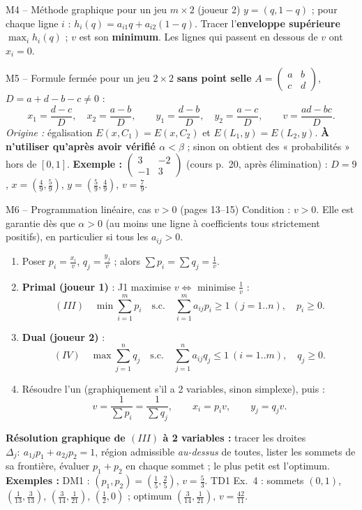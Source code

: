 \documentclass[11pt,a4paper]{article}
\begin{document}
\begin{methbox}{M4 -- Méthode graphique pour un jeu $m\times 2$ (joueur 2)}
$y=(q,1-q)$ ; pour chaque ligne $i$ : $h_i(q)=a_{i1}q+a_{i2}(1-q)$. Tracer l'\textbf{enveloppe supérieure} $\max_i h_i(q)$ ; $v$ est son \textbf{minimum}. Les lignes qui passent en dessous de $v$ ont $x_i=0$.
\end{methbox}

\begin{methbox}{M5 -- Formule fermée pour un jeu $2\times2$ \textbf{sans point selle}}
$A=\begin{pmatrix}a&b\\c&d\end{pmatrix}$, $D=a+d-b-c\ne0$ :
\[
x_1=\frac{d-c}{D},\quad x_2=\frac{a-b}{D},\qquad y_1=\frac{d-b}{D},\quad y_2=\frac{a-c}{D},\qquad v=\frac{ad-bc}{D}.
\]
\emph{Origine :} égalisation $E(x,C_1)=E(x,C_2)$ et $E(L_1,y)=E(L_2,y)$. \textbf{À n'utiliser qu'après avoir vérifié $\alpha<\beta$} ; sinon on obtient des « probabilités » hors de $[0,1]$.
\textbf{Exemple :} $\begin{pmatrix}3&-2\\-1&3\end{pmatrix}$ (cours p.~20, après élimination) : $D=9$, $x=(\frac49,\frac59)$, $y=(\frac59,\frac49)$, $v=\frac79$.
\end{methbox}

\begin{methbox}{M6 -- Programmation linéaire, cas $v>0$ (pages 13--15)}
Condition : $v>0$. Elle est garantie dès que $\alpha>0$ (au moins une ligne à coefficients tous strictement positifs), en particulier si tous les $a_{ij}>0$.
\begin{enumerate}[leftmargin=*]
\item Poser $p_i=\frac{x_i}{v}$, $q_j=\frac{y_j}{v}$ ; alors $\sum p_i=\sum q_j=\frac1v$.
\item \textbf{Primal (joueur 1)} : J1 maximise $v\iff$ minimise $\frac1v$ :
\[
(III)\quad \min\sum_{i=1}^m p_i\quad\text{s.c.}\quad \sum_{i=1}^m a_{ij}p_i\ge1\ (j=1..n),\quad p_i\ge0.
\]
\item \textbf{Dual (joueur 2)} :
\[
(IV)\quad \max\sum_{j=1}^n q_j\quad\text{s.c.}\quad \sum_{j=1}^n a_{ij}q_j\le1\ (i=1..m),\quad q_j\ge0.
\]
\item Résoudre l'un (graphiquement s'il a 2 variables, sinon simplexe), puis :
\[
v=\frac1{\sum p_i}=\frac1{\sum q_j},\qquad x_i=p_iv,\qquad y_j=q_jv.
\]
\end{enumerate}
\textbf{Résolution graphique de $(III)$ à 2 variables :} tracer les droites $\Delta_j:\ a_{1j}p_1+a_{2j}p_2=1$, région admissible \emph{au-dessus} de toutes, lister les sommets de sa frontière, évaluer $p_1+p_2$ en chaque sommet ; le plus petit est l'optimum.
\textbf{Exemples :} DM1 : $(p_1,p_2)=(\frac15,\frac25)$, $v=\frac53$. TD1 Ex.~4 : sommets $(0,1)$, $(\frac1{13},\frac3{13})$, $(\frac3{14},\frac1{21})$, $(\frac12,0)$ ; optimum $(\frac3{14},\frac1{21})$, $v=\frac{42}{11}$.
\end{methbox}
\end{document}
